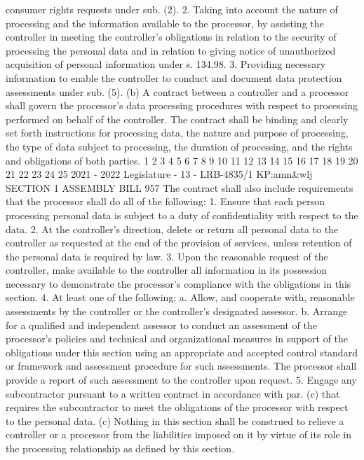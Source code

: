 consumer rights requests under sub. (2).
2. Taking into account the nature of processing and the information available
to the processor, by assisting the controller in meeting the controller's obligations in
relation to the security of processing the personal data and in relation to giving notice
of unauthorized acquisition of personal information under s. 134.98.
3. Providing necessary information to enable the controller to conduct and
document data protection assessments under sub. (5).
(b) A contract between a controller and a processor shall govern the processor's
data processing procedures with respect to processing performed on behalf of the
controller. The contract shall be binding and clearly set forth instructions for
processing data, the nature and purpose of processing, the type of data subject to
processing, the duration of processing, and the rights and obligations of both parties.
1
2
3
4
5
6
7
8
9
10
11
12
13
14
15
16
17
18
19
20
21
22
23
24
25
2021 - 2022 Legislature - 13 - LRB-4835/1
KP:amn&wlj
SECTION 1 ASSEMBLY BILL 957
The contract shall also include requirements that the processor shall do all of the
following:
1. Ensure that each person processing personal data is subject to a duty of
confidentiality with respect to the data.
2. At the controller's direction, delete or return all personal data to the
controller as requested at the end of the provision of services, unless retention of the
personal data is required by law.
3. Upon the reasonable request of the controller, make available to the
controller all information in its possession necessary to demonstrate the processor's
compliance with the obligations in this section.
4. At least one of the following:
a. Allow, and cooperate with, reasonable assessments by the controller or the
controller's designated assessor.
b. Arrange for a qualified and independent assessor to conduct an assessment
of the processor's policies and technical and organizational measures in support of
the obligations under this section using an appropriate and accepted control
standard or framework and assessment procedure for such assessments. The
processor shall provide a report of such assessment to the controller upon request.
5. Engage any subcontractor pursuant to a written contract in accordance with
par. (c) that requires the subcontractor to meet the obligations of the processor with
respect to the personal data.
(c) Nothing in this section shall be construed to relieve a controller or a
processor from the liabilities imposed on it by virtue of its role in the processing
relationship as defined by this section.
